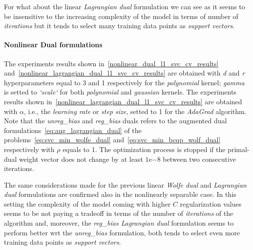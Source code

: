 For what about the linear \emph{Lagrangian dual} formulation we can see as it seems to be insensitive to the increasing complexity of the model in terms of number of \emph{iterations} but it tends to select many training data points as \emph{support vectors}.

\paragraph{Nonlinear Dual formulations}

The experiments results shown in~\ref{nonlinear_dual_l1_svc_cv_results} and~\ref{nonlinear_lagrangian_dual_l1_svc_cv_results} are obtained with \emph{d} and \emph{r} hyperparameters equal to 3 and 1 respectively for the \emph{polynomial} kernel; \emph{gamma} is setted to \emph{`scale`} for both \emph{polynomial} and \emph{gaussian} kernels. The experiments results shown in~\ref{nonlinear_lagrangian_dual_l1_svc_cv_results} are obtained with $\alpha$, i.e., the \emph{learning rate} or \emph{step size}, setted to 1 for the \emph{AdaGrad} algorithm. Note that the \emph{unreg\_bias} and \emph{reg\_bias} duals refers to the augmented dual formulations~\eqref{eq:aug_lagrangian_dual} of the problems~\eqref{eq:svc_min_wolfe_dual} and~\eqref{eq:svc_min_bcqp_wolf_dual} respectively with $\rho$ equals to 1. The optimization process is stopped if the primal-dual weight vector does not change by at least $1\mathrm{e}{-8}$  between two consecutive iterations.





The same considerations made for the previous linear \emph{Wolfe dual} and \emph{Lagrangian dual} formulations are confirmed also in the nonlinearly separable case. In this setting the complexity of the model coming with higher $C$ regularization values seems to be not paying a tradeoff in terms of the number of \emph{iterations} of the algorithm and, moreover, the \emph{reg\_bias Lagrangian dual} formulation seems to perform better wrt the \emph{unreg\_bias} formulation, both tends to select even more training data points as \emph{support vectors}.

